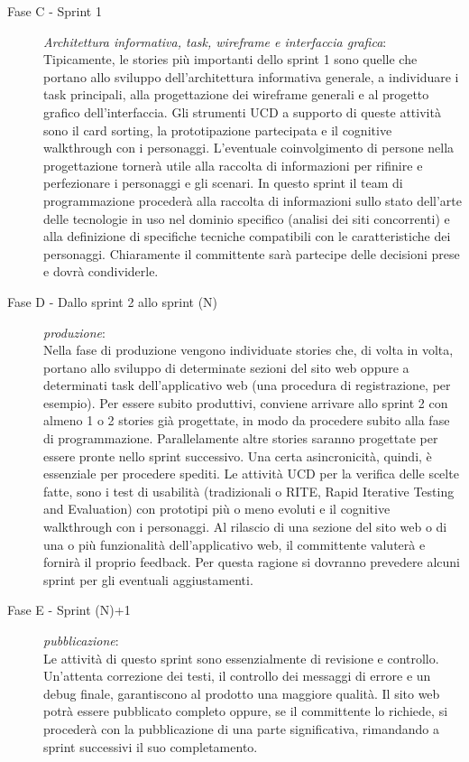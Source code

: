 \documentclass[oneside]{book}
\begin{document}
\begin{description}
			\item[Fase C - Sprint 1] \small{\emph{Architettura informativa, task, wireframe e interfaccia grafica}}:
			Tipicamente, le stories più importanti dello sprint 1 sono quelle che portano allo sviluppo dell’architettura informativa generale, a individuare i task principali, alla progettazione dei wireframe generali e al progetto grafico dell’interfaccia. Gli strumenti UCD a supporto di queste attività sono il card sorting, la prototipazione partecipata e il cognitive walkthrough con i personaggi. L’eventuale coinvolgimento di persone nella progettazione tornerà utile alla raccolta di informazioni per rifinire e perfezionare i personaggi e gli scenari. In questo sprint il team di programmazione procederà alla raccolta di informazioni sullo stato dell’arte delle tecnologie in uso nel dominio specifico (analisi dei siti concorrenti) e alla definizione di specifiche tecniche compatibili con le caratteristiche dei personaggi. Chiaramente il committente sarà partecipe delle decisioni prese e dovrà condividerle. 

			\item[Fase D - Dallo sprint 2 allo sprint (N)] \emph{produzione}: \\
			Nella fase di produzione vengono individuate stories che, di volta in volta, portano allo sviluppo di determinate sezioni del sito web oppure a determinati task dell’applicativo web (una procedura di registrazione, per esempio). Per essere subito produttivi, conviene arrivare allo sprint 2 con almeno 1 o 2 stories già progettate, in modo da procedere subito alla fase di programmazione. Parallelamente altre stories saranno progettate per essere pronte nello sprint successivo. Una certa asincronicità, quindi, è essenziale per procedere spediti. Le attività UCD per la verifica delle scelte fatte, sono i test di usabilità (tradizionali o RITE, Rapid Iterative Testing and Evaluation) con prototipi più o meno evoluti e il cognitive walkthrough con i personaggi. Al rilascio di una sezione del sito web o di una o più funzionalità dell’applicativo web, il committente valuterà e fornirà il proprio feedback. Per questa ragione si dovranno prevedere alcuni sprint per gli eventuali aggiustamenti. 

			\item[Fase E - Sprint (N)+1] \emph{pubblicazione}: \\
			Le attività di questo sprint sono essenzialmente di revisione e controllo. Un’attenta correzione dei testi, il controllo dei messaggi di errore e un debug finale, garantiscono al prodotto una maggiore qualità. Il sito web potrà essere pubblicato completo oppure, se il committente lo richiede, si procederà con la pubblicazione di una parte significativa, rimandando a sprint successivi il suo completamento. 


\end{description}
\end{document}
